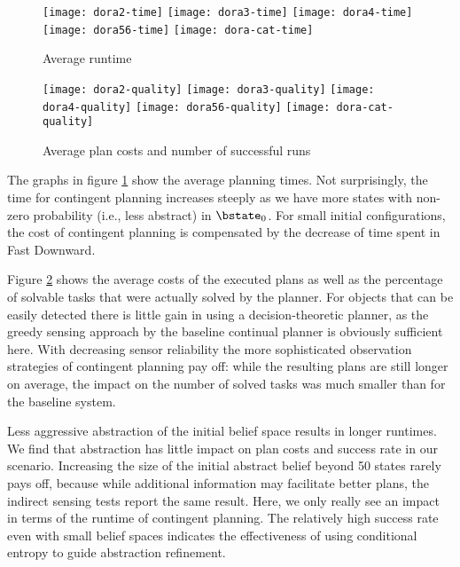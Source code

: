 \begin{figure}[h!]
  \texttt{[image: dora2-time]}\hfill
  \vspace{2mm}
  \texttt{[image: dora3-time]}\hfill
  \vspace{2mm}
  \texttt{[image: dora4-time]}\hfill
  \vspace{2mm}
  \texttt{[image: dora56-time]}\hfill
  \vspace{2mm}
  \texttt{[image: dora-cat-time]}\hfill
  \caption{Average runtime}
  \label{fig:results-time}
\end{figure}

\begin{figure}[h!]
  \texttt{[image: dora2-quality]}\hfill
  \vspace{2mm}
  \texttt{[image: dora3-quality]}\hfill
  \vspace{2mm}
  \texttt{[image: dora4-quality]}\hfill
  \vspace{2mm}
  \texttt{[image: dora56-quality]}\hfill
  \vspace{2mm}
  \texttt{[image: dora-cat-quality]}\hfill
  \caption{Average plan costs and number of successful runs}
  \label{fig:results-quality}
\end{figure}

The graphs in figure \ref{fig:results-time} show the average planning
times. Not surprisingly, the time for contingent planning increases
steeply as we have more states with non-zero probability (i.e., less
abstract) in $\bstate_0$. For small initial configurations, the cost
of contingent planning is compensated by the decrease of time spent in
Fast Downward.

Figure \ref{fig:results-quality} shows the average costs of the
executed plans as well as the percentage of solvable tasks that were
actually solved by the planner. For objects that can be easily
detected there is little gain in using a decision-theoretic planner,
as the greedy sensing approach by the baseline continual planner is
obviously sufficient here. With decreasing sensor reliability the more
sophisticated observation strategies of contingent planning pay off:
while the resulting plans are still longer on average, the impact on
the number of solved tasks was much smaller than for the baseline
system.

Less aggressive abstraction of the initial belief space results in
longer runtimes. We find that abstraction has little impact on plan
costs and success rate in our scenario. Increasing the size of the
initial abstract belief beyond 50 states rarely pays off, because
while additional information may facilitate better plans, the indirect
sensing tests report the same result. Here, we only really see an
impact in terms of the runtime of contingent planning. The relatively
high success rate even with small belief spaces indicates the
effectiveness of using conditional entropy to guide abstraction
refinement.

